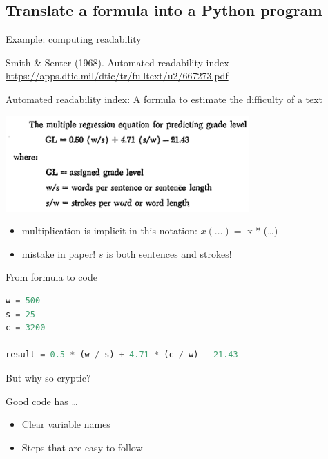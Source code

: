 \documentclass[aspectratio=169,usenames,dvipsnames]{beamer}
\begin{document}
\subsection{Translate a formula into a Python program}
\frame{\tableofcontents[currentsubsection]}
\begin{frame}{Example: computing readability}
	\begin{reference}
    Smith \& Senter (1968). Automated readability index
    \url{https://apps.dtic.mil/dtic/tr/fulltext/u2/667273.pdf}
	\end{reference}
    Automated readability index:
    A formula to estimate the difficulty of a text

    \includegraphics[width=0.7\textwidth]{fig/ari}

    \pause
    \vspace{1em}
    \begin{itemize}
        \item multiplication is implicit in this notation: $ x(\dots) = $ x * (\dots)
        \item mistake in paper! $s$ is both sentences and strokes!
    \end{itemize}
\end{frame}

\begin{frame}[fragile]{From formula to code}
\begin{lstlisting}[language=python]
w = 500
s = 25
c = 3200

result = 0.5 * (w / s) + 4.71 * (c / w) - 21.43
\end{lstlisting}

\pause But why so cryptic?

    Good code has \dots

\begin{itemize}
    \item Clear variable names
    \item Steps that are easy to follow
\end{itemize}
\end{frame}
\end{document}
